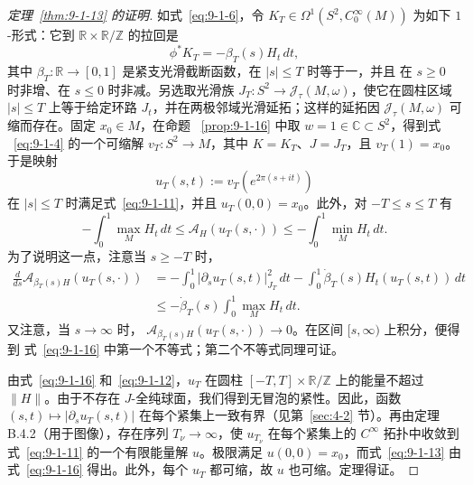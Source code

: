 \begin{proof}[定理~\ref{thm:9-1-13} 的证明]
如式~\eqref{eq:9-1-6}，令
$K_T\in\Omega^1(S^2,C_0^\infty(M))$ 为如下 $1$-形式：它到
$\mathbb R\times\mathbb R/\mathbb Z$ 的拉回是
\[
  \phi^*K_T=-\beta_T(s)H_t\,dt,
\]
其中 $\beta_T:\mathbb R\to[0,1]$ 是紧支光滑截断函数，在 $|s|\le T$ 时等于一，并且
在 $s\ge0$ 时非增、在 $s\le0$ 时非减。另选取光滑族
$J_T:S^2\to\mathcal J_\tau(M,\omega)$，使它在圆柱区域 $|s|\le T$ 上等于给定环路
$J_t$，并在两极邻域光滑延拓；这样的延拓因
$\mathcal J_\tau(M,\omega)$ 可缩而存在。固定 $x_0\in M$，在命题
~\ref{prop:9-1-16} 中取 $w=1\in\mathbb C\subset S^2$，得到式
~\eqref{eq:9-1-4} 的一个可缩解 $v_T:S^2\to M$，其中 $K=K_T$、$J=J_T$，且
$v_T(1)=x_0$。于是映射
\[
  u_T(s,t):=v_T(e^{2\pi(s+it)})
\]
在 $|s|\le T$ 时满足式~\eqref{eq:9-1-11}，并且 $u_T(0,0)=x_0$。此外，对
$-T\le s\le T$ 有
\begin{equation}\label{eq:9-1-16}
  -\int_0^1\max_MH_t\,dt
  \le\mathcal A_H(u_T(s,\cdot))
  \le-\int_0^1\min_MH_t\,dt.
\end{equation}
为了说明这一点，注意当 $s\ge-T$ 时，
\begin{align*}
  \frac d{ds}\mathcal A_{\beta_T(s)H}(u_T(s,\cdot))
  &=-\int_0^1|\partial_su_T(s,t)|_{J_T}^2\,dt
    -\int_0^1\dot\beta_T(s)H_t(u_T(s,t))\,dt\\
  &\le-\dot\beta_T(s)\int_0^1\max_MH_t\,dt.
\end{align*}
又注意，当 $s\to\infty$ 时，
$\mathcal A_{\beta_T(s)H}(u_T(s,\cdot))\to0$。在区间 $[s,\infty)$ 上积分，便得到
式~\eqref{eq:9-1-16} 中第一个不等式；第二个不等式同理可证。

由式~\eqref{eq:9-1-16} 和~\eqref{eq:9-1-12}，$u_T$ 在圆柱
$[-T,T]\times\mathbb R/\mathbb Z$ 上的能量不超过 $\|H\|$。由于不存在
$J$-全纯球面，我们得到无冒泡的紧性。因此，函数
$(s,t)\mapsto|\partial_su_T(s,t)|$ 在每个紧集上一致有界（见第~\ref{sec:4-2} 节）。再由定理
B.4.2（用于图像），存在序列 $T_\nu\to\infty$，使 $u_{T_\nu}$ 在每个紧集上的
$C^\infty$ 拓扑中收敛到式~\eqref{eq:9-1-11} 的一个有限能量解 $u$。极限满足
$u(0,0)=x_0$，而式~\eqref{eq:9-1-13} 由式~\eqref{eq:9-1-16} 得出。此外，每个
$u_T$ 都可缩，故 $u$ 也可缩。定理得证。
\end{proof}

